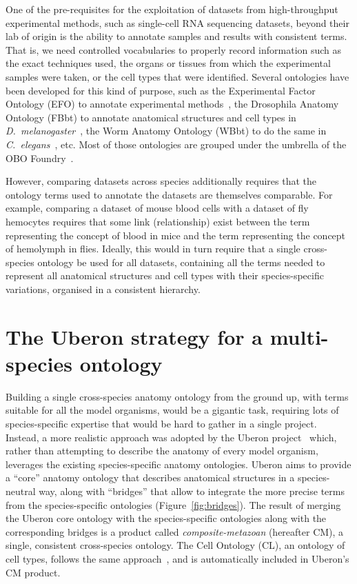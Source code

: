 \documentclass{ceurart}
\def\species#1{\textit{#1}}
\begin{document}
One of the pre-requisites for the exploitation of datasets from
high-throughput experimental methods, such as single-cell RNA sequencing
datasets, beyond their lab of origin is the ability to annotate samples
and results with consistent terms. That is, we need controlled
vocabularies to properly record information such as the exact
techniques used, the organs or tissues from which the experimental
samples were taken, or the cell types that were identified. Several
ontologies have been developed for this kind of purpose, such as the
Experimental Factor Ontology (EFO) to annotate experimental
methods~\cite{malone2010}, the Drosophila Anatomy Ontology (FBbt) to
annotate anatomical structures and cell types in
\species{D.~melanogaster}~\cite{costa2013}, the Worm Anatomy Ontology
(WBbt) to do the same in \species{C.~elegans}~\cite{lee2003}, etc. Most
of those ontologies are grouped under the umbrella of the OBO
Foundry~\cite{jackson2021}.

However, comparing datasets across species additionally requires that
the ontology terms used to annotate the datasets are themselves
comparable. For example, comparing a dataset of mouse blood cells with a
dataset of fly hemocytes requires that some link (relationship) exist
between the term representing the concept of blood in mice and the term
representing the concept of hemolymph in flies. Ideally, this would in
turn require that a single cross-species ontology be used for all
datasets, containing all the terms needed to represent all anatomical
structures and cell types with their species-specific variations,
organised in a consistent hierarchy.

\section{The Uberon strategy for a multi-species ontology}

Building a single cross-species anatomy ontology from the ground up, with terms
suitable for all the model organisms, would be a gigantic task, requiring lots
of species-specific expertise that would be hard to gather in a single project.
Instead, a more realistic approach was adopted by the Uberon
project~\cite{mungall2012a} which, rather than attempting to describe the
anatomy of every model organism, leverages the existing species-specific
anatomy ontologies. Uberon aims to provide a ``core'' anatomy ontology that
describes anatomical structures in a species-neutral way, along with
``bridges'' that allow to integrate the more precise terms from the
species-specific ontologies (Figure~\ref{fig:bridges}). The result of merging
the Uberon core ontology with the species-specific ontologies along with the
corresponding bridges is a product called \emph{composite-metazoan} (hereafter
CM), a single, consistent cross-species ontology. The Cell Ontology (CL), an
ontology of cell types, follows the same approach~\cite{diehl2016}, and is
automatically included in Uberon's CM product.
\end{document}
